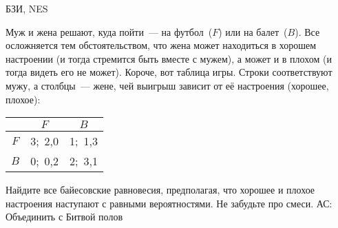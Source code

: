 \begin{problem}
\begin{source}
БЗИ, NES
\end{source} Муж и жена решают, куда пойти~--- на
футбол~($F$) или на балет~($B$). Все осложняется тем
обстоятельством, что жена может находиться в хорошем
настроении (и тогда стремится быть вместе с мужем), а может
и в плохом (и тогда видеть его не может). Короче, вот
таблица игры. Строки соответствуют мужу, а столбцы~---
жене, чей выигрыш зависит от её настроения (хорошее, плохое):
\begin{center}
\begin{tabular}{|c|cc|}
\hline &$F$&$B$\\ \hline $F$&3;\ 2,0&1;\ 1,3\\ $B$&0;\
0,2&2;\ 3,1\\ \hline
\end{tabular}
\end{center}

 Найдите все байесовские равновесия, предполагая, что хорошее и плохое
настроения  наступают с равными вероятностями. Не
забудьте про смеси.
{\red АС: Объединить с Битвой полов}
\begin{sol}

\end{sol}
\end{problem}



